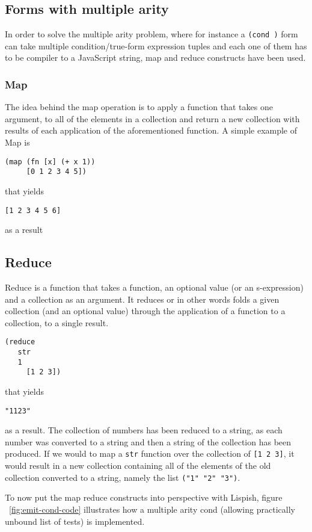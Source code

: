 

\subsection{Forms with multiple arity}

In order to solve the multiple arity problem, where for instance a \texttt{(cond )} form can take multiple condition/true-form expression tuples and each one of them has to be compiler to a JavaScript string, map and reduce constructs have been used. 

\subsubsection{Map}
The idea behind the map operation is to apply a function that takes one argument, to all of the elements in a collection and return a new collection with results of each application of the aforementioned function. 
A simple example of Map is 

\begin{verbatim}
(map (fn [x] (+ x 1)) 
	 [0 1 2 3 4 5])
\end{verbatim}
that yields 
\begin{verbatim}
[1 2 3 4 5 6]
\end{verbatim}
as a result

\subsection{Reduce}
Reduce is a function that takes a function, an optional value (or an s-expression) and a collection as an argument. It reduces or in other words folds a given collection (and an optional value) through the application of a function to a collection, to a single result. 
\begin{verbatim}
(reduce 
   str
   1
	 [1 2 3])
\end{verbatim}
that yields 
\begin{verbatim}
"1123"
\end{verbatim}
as a result. The collection of numbers has been reduced to a string, as each number was converted to a string and then a string of the collection has been produced.
If we would to map a \texttt{str} function over the collection of \texttt{[1 2 3]}, it would result in a new collection containing all of the elements of the old collection converted to a string, namely the list \texttt{("1" "2" "3")}.

To now put the map reduce constructs into perspective with Lispish, figure ~\ref{fig:emit-cond-code} illustrates how a multiple arity cond (allowing practically unbound list of tests) is implemented.


